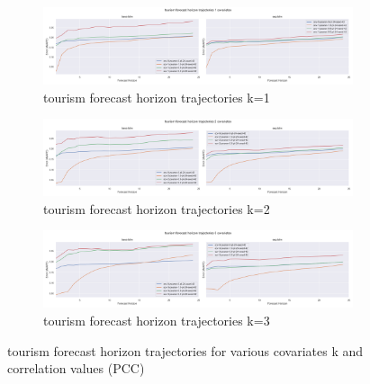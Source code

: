 \documentclass[letterpaper]{article}
\begin{document}
\begin{figure}[tbp]

\begin{subfigure}{\textwidth}
\centering
\includegraphics[width=\linewidth]{figures/base-lstm_seg-lstm_tourism_k_1_trajectory.png}
\caption{tourism forecast horizon trajectories k=1}
\label{fig:base-lstm_seg-lstm_tourism_k_1_trajectory}
\end{subfigure}

\begin{subfigure}{\textwidth}
\centering
\includegraphics[width=\linewidth]{figures/base-lstm_seg-lstm_tourism_k_2_trajectory.png}
\caption{tourism forecast horizon trajectories k=2}
\label{fig:base-lstm_seg-lstm_tourism_k_2_trajectory}
\end{subfigure}

\begin{subfigure}{\textwidth}
\centering
\includegraphics[width=\linewidth]{figures/base-lstm_seg-lstm_tourism_k_3_trajectory.png}
\caption{tourism forecast horizon trajectories k=3}
\label{fig:base-lstm_seg-lstm_tourism_k_3_trajectory}
\end{subfigure}
\caption{tourism forecast horizon trajectories for various covariates k and correlation values (PCC)}
\label{fig:base-lstm_seg-lstm_tourism_trajectory}
\end{figure}
\end{document}
